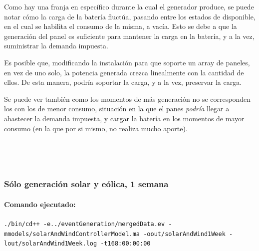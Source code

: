 Como hay una franja en específico durante la cual el generador produce,
se puede notar cómo la carga de la batería fluctúa, pasando entre los
estados de disponible, en el cual se habilita el consumo de la misma, a
vacía. Esto se debe a que la generación del panel es suficiente para
mantener la carga en la batería, y a la vez, suministrar la demanda
impuesta.

Es posible que, modificando la instalación para que soporte un array de
paneles, en vez de uno solo, la potencia generada crezca linealmente con
la cantidad de ellos. De esta manera, podría soportar la carga, y a la
vez, preservar la carga.

Se puede ver también como los momentos de más generación no se
corresponden los con los de menor consumo, situación en la que el panes
\emph{podría} llegar a abastecer la demanda impuesta, y cargar la
batería en los momentos de mayor consumo (en la que por si mismo, no
realiza mucho aporte).

    \begin{center}
    \end{center}
    { \hspace*{\fill} \\}
    
    \begin{center}
    \end{center}
    { \hspace*{\fill} \\}
    
    \hypertarget{suxf3lo-generaciuxf3n-solar-y-euxf3lica-1-semana}{%
\subsubsection{Sólo generación solar y eólica, 1
semana}\label{suxf3lo-generaciuxf3n-solar-y-euxf3lica-1-semana}}

\hypertarget{comando-ejecutado}{%
\paragraph{Comando ejecutado:}\label{comando-ejecutado}}

\texttt{./bin/cd++\ -e../eventGeneration/mergedData.ev\ -mmodels/solarAndWindControllerModel.ma\ -oout/solarAndWind1Week\ -lout/solarAndWind1Week.log\ -t168:00:00:00}

